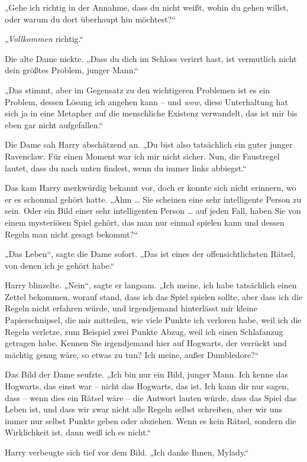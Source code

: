 {„Gehe ich richtig in der Annahme, dass du nicht weißt, wohin du gehen willst, oder warum du dort überhaupt hin möchtest?“

\emph{„Vollkommen} richtig.“

Die alte Dame nickte. „Dass du dich im Schloss verirrt hast, ist vermutlich nicht dein größtes Problem, junger Mann.“

„Das stimmt, aber im Gegensatz zu den wichtigeren Problemen ist es ein Problem, dessen Lösung ich angehen kann -- und \emph{wow,} diese Unterhaltung hat sich ja in eine Metapher auf die menschliche Existenz verwandelt, das ist mir bis eben gar nicht aufgefallen.“

Die Dame sah Harry abschätzend an. „Du bist also tatsächlich ein guter junger Ravenclaw. Für einen Moment war ich mir nicht sicher. Nun, die Faustregel lautet, dass du nach unten findest, wenn du immer links abbiegst.“

Das kam Harry merkwürdig bekannt vor, doch er konnte sich nicht erinnern, wo er es schonmal gehört hatte. „Ähm … Sie scheinen eine sehr intelligente Person zu sein. Oder ein Bild einer sehr intelligenten Person … auf jeden Fall, haben Sie von einem mysteriösen Spiel gehört, das man nur einmal spielen kann und dessen Regeln man nicht gesagt bekommt?“

„Das Leben“, sagte die Dame sofort. „Das ist eines der offensichtlichsten Rätsel, von denen ich je gehört habe.“

Harry blinzelte. „Nein“, sagte er langsam. „Ich meine, ich habe tatsächlich einen Zettel bekommen, worauf stand, dass ich das Spiel spielen sollte, aber dass ich die Regeln nicht erfahren würde, und irgendjemand hinterlässt mir kleine Papierschnipsel, die mir mitteilen, wie viele Punkte ich verloren habe, weil ich die Regeln verletze, zum Beispiel zwei Punkte Abzug, weil ich einen Schlafanzug getragen habe. Kennen Sie irgendjemand hier auf Hogwarts, der verrückt und mächtig genug wäre, so etwas zu tun? Ich meine, außer Dumbledore?“

Das Bild der Dame seufzte. „Ich bin nur ein Bild, junger Mann. Ich kenne das Hogwarts, das einst war -- nicht das Hogwarts, das ist. Ich kann dir nur sagen, dass -- wenn dies ein Rätsel wäre -- die Antwort lauten würde, dass das Spiel das Leben ist, und dass wir zwar nicht alle Regeln selbst schreiben, aber wir uns immer nur selbst Punkte geben oder abziehen. Wenn es kein Rätsel, sondern die Wirklichkeit ist, dann weiß ich es nicht.“

Harry verbeugte sich tief vor dem Bild. „Ich danke Ihnen, Mylady.“

}
